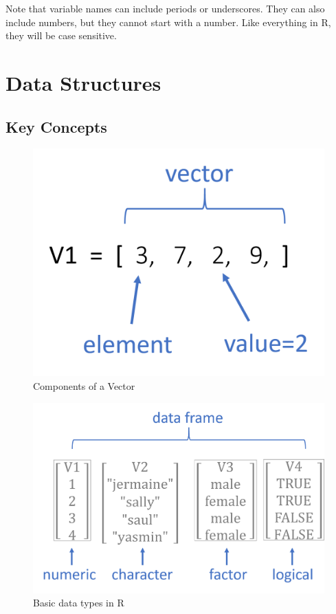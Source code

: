 \documentclass[]{book}
\theoremstyle{definition}
\theoremstyle{definition}
\theoremstyle{definition}
\theoremstyle{remark}
\begin{document}
Note that variable names can include periods or underscores. They can
also include numbers, but they cannot start with a number. Like
everything in R, they will be case sensitive.

\hypertarget{data-structures}{%
\chapter{Data Structures}\label{data-structures}}

\hypertarget{key-concepts-1}{%
\section{Key Concepts}\label{key-concepts-1}}

\begin{figure}

{\centering \includegraphics[width=0.7\linewidth]{figures/vectors} 

}

\caption{Components of a Vector}\label{fig:unnamed-chunk-40}
\end{figure}

\begin{figure}

{\centering \includegraphics[width=0.7\linewidth]{figures/data_types} 

}

\caption{Basic data types in R}\label{fig:unnamed-chunk-41}
\end{figure}
\end{document}
